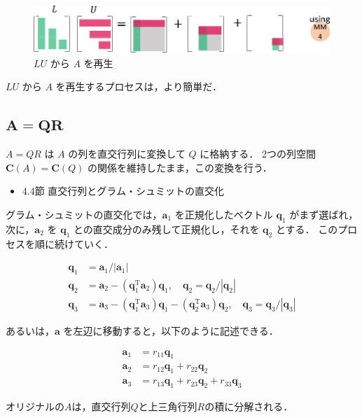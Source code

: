 \documentclass[letterpaper]{article}
\DeclareRobustCommand\transp{^{\mathrm{T}}}
\begin{document}
\begin{figure}[H]
  \includegraphics[keepaspectratio, width=\linewidth]{LU2.eps}
\caption{$LU$ から $A$ を再生}
\end{figure}

$LU$ から $A$ を再生するプロセスは，より簡単だ．

\clearpage

\subsection{$\boldsymbol{A=QR}$}

$A=QR$ は $A$ の列を直交行列に変換して $Q$ に格納する．
2つの列空間 $\bm{C}(A) = \bm{C}(Q)$ の関係を維持したまま，この変換を行う．

\begin{itemize}
  \item 4.4節 直交行列とグラム・シュミットの直交化
\end{itemize}

グラム・シュミットの直交化では，$\bm{a}_1$ を正規化したベクトル $\bm{q}_1$ がまず選ばれ，
次に，$\bm{a}_2$ を $\bm{q}_1$ との直交成分のみ残して正規化し，それを $\bm{q}_2$ とする．
このプロセスを順に続けていく．

\begin{align*}
  \bm{q}_1 &= \bm{a}_1/|\bm{a}_1| \\
  \bm{q}_2 &= \bm{a}_2 - (\bm{q}_1\transp \bm{a}_2)\bm{q}_1 , \quad \bm{q}_2 = \bm{q}_2/|\bm{q}_2| \\
  \bm{q}_3 &= \bm{a}_3 - (\bm{q}_1\transp \bm{a}_3)\bm{q}_1 - (\bm{q}_2\transp \bm{a}_3)\bm{q}_2, \quad \bm{q}_3 = \bm{q}_3/|\bm{q}_3|
\end{align*}

あるいは，$\bm{a}$ を左辺に移動すると，以下のように記述できる．

\begin{align*}
  \bm{a}_1 &= r_{11}\bm{q}_1\\
  \bm{a}_2 &= r_{12}\bm{q}_1 + r_{22} \bm{q}_2\\
  \bm{a}_3 &= r_{13}\bm{q}_1 + r_{23} \bm{q}_2 + r_{33} \bm{q}_3
\end{align*}

オリジナルの$A$は，直交行列$Q$と上三角行列$R$の積に分解される．
\end{document}

